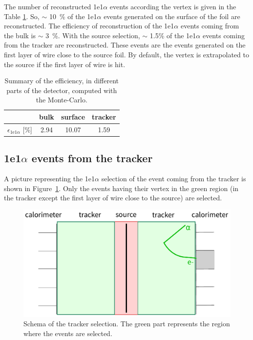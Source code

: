 \documentclass[main.tex]{subfiles}
\begin{document}
\bigskip

\noindent The number of reconstructed 1e1$\alpha$ events according the vertex is given in the Table \ref{efficiency_different_parts_foil_source}. So, $\sim$ 10~\% of the 1e1$\alpha$ events generated on the surface of the foil are reconstructed. The efficiency of reconstruction of the 1e1$\alpha$ events coming from the bulk is $\sim$ 3~\%. With the source selection, $\sim$ 1.5\% of the 1e1$\alpha$ events coming from the tracker are reconstructed. These events are the events generated on the first layer of wire close to the source foil. By default, the vertex is extrapolated to the source if the first layer of wire is hit.


\begin{table}[h!]
\begin{center}
\begin{tabular}{c|c|c|c}
           & bulk   & surface & tracker \\
\hline
$\epsilon_{\text{1e1}\alpha}$ [\%] & 2.94 & 10.07  & 1.59 \\
\hline
\end{tabular}
\end{center}
\caption{Summary of the efficiency, in different parts of the detector, computed with the Monte-Carlo.}
\label{efficiency_different_parts_foil_source}
\end{table}


\FloatBarrier


\subsection{1e1$\alpha$ events from the tracker}


\noindent A picture representing the 1e1$\alpha$ selection of the event coming from the tracker is shown in Figure~\ref{cartoon_tracker_selection}. Only the events having their vertex in the green region (in the tracker except the first layer of wire close to the source) are selected.

 
\begin{figure}[h!]
\begin{center}
\includegraphics[scale=0.6]{pictures/Chap5/cartoon_tracker_selection.pdf}
\caption{Schema of the tracker selection. The green part represents the region where the events are selected.}
\label{cartoon_tracker_selection}
\end{center}
\end{figure}
\end{document}
